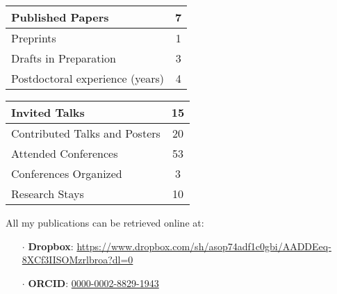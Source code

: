 \documentclass[a4paper]{article}
\begin{document}
		\begin{minipage}[t]{0.45\columnwidth}
		\center
	\begin{tabularx}{\linewidth}{|X|c|}
	\hline
	
	Published Papers & 7 \\
	\hline
	
	Preprints & 1 \\
	\hline
	
	Drafts in Preparation & 3 \\
	\hline
	
	Postdoctoral experience (years) & 4 \\
	\hline
	
	\end{tabularx}
		\end{minipage} 
		\hfill	
		\begin{minipage}[t]{0.45\columnwidth}
		\center
	\begin{tabularx}{\linewidth}{|X|c|}
	\hline
	
	Invited Talks & 15 \\
	\hline
	
	Contributed Talks and Posters & 20 \\
	\hline
	
	Attended Conferences & 53 \\
	\hline

	Conferences Organized & 3 \\
	\hline	
	Research Stays & 10 \\
	\hline
	
	\end{tabularx}
		\end{minipage} 	
	\vspace{1em}	
	
	
	
	All my publications can be retrieved online at:
	\begin{itemize}[leftmargin=*, itemsep=0pt, parsep=0pt, topsep=0pt, partopsep=0pt]
		\item[$\cdot$] \textbf{Dropbox}: \url{https://www.dropbox.com/sh/asop74adf1c0gbi/AADDEeq-8XCf3IISOMzrlbroa?dl=0}
		\item[$\cdot$] \textbf{ORCID}: \href{https://orcid.org/0000-0002-8829-1943}{0000-0002-8829-1943}
	\end{itemize}
	\vspace{1em}


\end{document}
